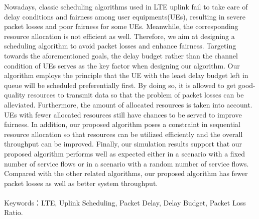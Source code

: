 
Nowadays, classic scheduling algorithms used in LTE uplink fail to take care of delay conditions and fairness among user equipments(UEs), resulting in severe packet losses and poor fairness for some UEs. Meanwhile, the corresponding resource allocation is not efficient as well. Therefore, we aim at designing a scheduling algorithm to avoid packet losses and enhance fairness. Targeting towards the aforementioned goals, the delay budget rather than the channel condition of UEs serves as the key factor when designing our algorithm. Our algorithm employs the principle that the UE with the least delay budget left in queue will be scheduled preferentially first. By doing so, it is allowed to get good-quality resources to transmit data so that the problem of packet losses can be alleviated. Furthermore, the amount of allocated resources is taken into account. UEs with fewer allocated resources still have chances to be served to improve fairness. In addition, our proposed algorithm poses a constraint in sequential resource allocation so that resources can be utilized efficiently and the overall throughput can be improved. Finally, our simulation results support that our proposed algorithm performs well as expected either in a scenario with a fixed number of service flows or in a scenario with a random number of service flows. Compared with the other related algorithms, our proposed algorithm has fewer packet losses as well as better system throughput.
\\
\\
Keywords：LTE, Uplink Scheduling, Packet Delay, Delay Budget, Packet Loss Ratio.

